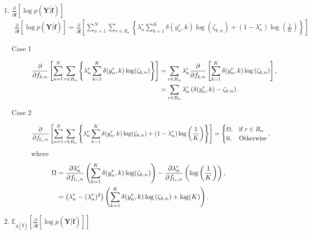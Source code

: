 \documentclass[9pt]{article}
\providecommand{\ve}[1]{{\bm{#1}}}%
\providecommand{\mat}[1]{{\bm{#1}}} %
\providecommand{\ve}[1]{{\mathbf{#1}}}
\providecommand{\mat}[1]{{\mathbf{#1}}}
\newcommand{\fracpartial}[2]{\frac{\partial #1}{\partial  #2}} %
\begin{document}
\begin{enumerate}
	\item $\fracpartial{}{\hat{\ve{f}}}\left[\log p(\mat{Y}|\hat{\ve{f}})\right]$
	\begin{align}
	\fracpartial{}{\hat{\ve{f}}}\left[\log p(\mat{Y}|\hat{\ve{f}})\right] = \fracpartial{}{\hat{\ve{f}}}\left[\sum^N_{n=1}\sum_{r\in R_n}\left\{{\lambda}_n^r\sum_{k=1}^{K}\delta(y_n^r,k)\log(\zeta_{k,n}) + (1- {\lambda}_n^r)\log\left(\frac{1}{K}\right)\right\}\right]
	\end{align}
	\begin{description}
		\item[Case 1]
		\begin{align}
		\notag\fracpartial{}{f_{k,n}}\left[\sum^N_{n=1}\sum_{r\in R_n}\left\{{\lambda}_n^r \sum_{k=1}^{K}\delta(y_n^r,k)\log(\zeta_{k,n}) \right\}\right] &=\sum_{r\in R_n}{\lambda}_n^r\fracpartial{}{f_{k,n}}\left[\sum_{k=1}^{K}\delta(y_n^r,k)\log\left(\zeta_{k,n}\right)\right],\\
		&=\sum_{r\in R_n}{\lambda}_n^r\left(\delta(y_n^r,k)-\zeta_{k,n}\right).
		\end{align}
		\item[Case 2]
		\begin{align}
		\notag\fracpartial{}{f_{l_r,n}}\left[\sum^N_{n=1}\sum_{r\in R_n}\left\{{\lambda}_n^r\sum_{k=1}^{K}\delta(y_n^r,k)\log(\zeta_{k,n}) + (1- {\lambda}_n^r) \log\left(\frac{1}{K}\right)\right\}\right]	& = \begin{cases}
		\Omega, & \mbox{if $r\in R_n$}\\
		0, & \mbox{Otherwise}
		\end{cases},
		\end{align}
		where 
		\begin{align}
		\notag\Omega &= \fracpartial{{\lambda}_n^r}{f_{l_r,n}}\left(\sum_{k=1}^{K}\delta(y_n^r,k)\log(\zeta_{k,n})\right) -\fracpartial{{\lambda}_n^r}{f_{l_r,n}}\left(\log\left(\frac{1}{K}\right)\right),\\
		&= \left({\lambda}_n^r - ({\lambda}_n^r)^2\right)\left(\sum_{k=1}^{K}\delta(y_n^r,k)\log\left(\zeta_{k,n}\right) + \log(K)\right).
		\end{align}
	\end{description}
	
	\item $\mathbb{E}_{q(\hat{\ve{f}})}\left[\fracpartial{}{\hat{\ve{f}}}\left[\log p(\mat{Y}|\hat{\ve{f}})\right]\right]$


\end{enumerate}
\end{document}
